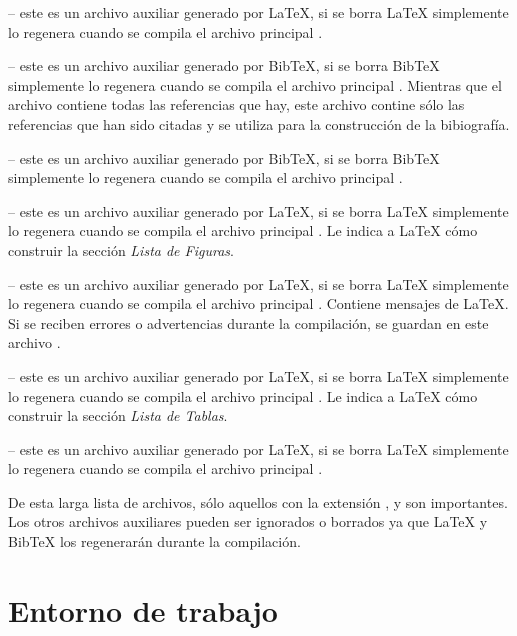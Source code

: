  -- este es un archivo auxiliar generado por \LaTeX{}, si se borra \LaTeX{} simplemente lo regenera cuando se compila el archivo principal .

 -- este es un archivo auxiliar generado por BibTeX, si se borra BibTeX simplemente lo regenera cuando se compila el archivo principal . Mientras que el archivo  contiene todas las referencias que hay, este archivo  contine sólo las referencias que han sido citadas y se utiliza para la construcción de la bibiografía.

 -- este es un archivo auxiliar generado por BibTeX, si se borra BibTeX simplemente lo regenera cuando se compila el archivo principal .

 -- este es un archivo auxiliar generado por \LaTeX{}, si se borra \LaTeX{} simplemente lo regenera cuando se compila el archivo principal .  Le indica a \LaTeX{} cómo construir la sección \emph{Lista de Figuras}.
 
 --  este es un archivo auxiliar generado por \LaTeX{}, si se borra \LaTeX{} simplemente lo regenera cuando se compila el archivo principal . Contiene mensajes de \LaTeX{}. Si se reciben errores o advertencias durante la compilación, se guardan en este archivo .

 -- este es un archivo auxiliar generado por \LaTeX{}, si se borra \LaTeX{} simplemente lo regenera cuando se compila el archivo principal .  Le indica a \LaTeX{} cómo construir la sección \emph{Lista de Tablas}.

 -- este es un archivo auxiliar generado por \LaTeX{}, si se borra \LaTeX{} simplemente lo regenera cuando se compila el archivo principal .

De esta larga lista de archivos, sólo aquellos con la extensión ,  y  son importantes.  Los otros archivos auxiliares pueden ser ignorados o borrados ya que \LaTeX{} y BibTeX los regenerarán durante la compilación.


\section{Entorno de trabajo}

